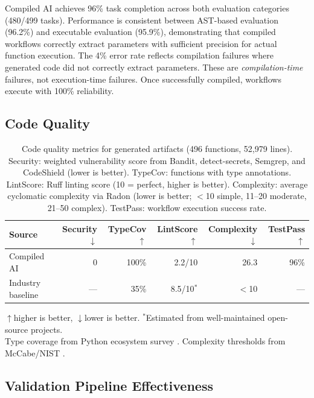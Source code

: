 \documentclass[11pt]{article}
\begin{document}
Compiled AI achieves 96\% task completion across both evaluation categories (480/499 tasks). Performance is consistent between AST-based evaluation (96.2\%) and executable evaluation (95.9\%), demonstrating that compiled workflows correctly extract parameters with sufficient precision for actual function execution. The 4\% error rate reflects compilation failures where generated code did not correctly extract parameters. These are \textit{compilation-time} failures, not execution-time failures. Once successfully compiled, workflows execute with 100\% reliability.

\subsection{Code Quality}

\begin{table}[ht]
\centering
\caption{Code quality metrics for generated artifacts (496 functions, 52,979 lines). Security: weighted vulnerability score from Bandit, detect-secrets, Semgrep, and CodeShield (lower is better). TypeCov: functions with type annotations. LintScore: Ruff linting score (10 = perfect, higher is better). Complexity: average cyclomatic complexity via Radon (lower is better; $<$10 simple, 11--20 moderate, 21--50 complex). TestPass: workflow execution success rate.}
\label{tab:quality-results}
\begin{tabular}{lrrrrr}
\toprule
Source & Security$\downarrow$ & TypeCov$\uparrow$ & LintScore$\uparrow$ & Complexity$\downarrow$ & TestPass$\uparrow$ \\
\midrule
Compiled AI & 0 & 100\% & 2.2/10 & 26.3 & 96\% \\
Industry baseline & --- & 35\% & 8.5/10$^*$ & $<$10 & --- \\
\bottomrule
\end{tabular}
\begin{flushleft}
\scriptsize{$\uparrow$higher is better, $\downarrow$lower is better. $^*$Estimated from well-maintained open-source projects.\\
Type coverage from Python ecosystem survey \citep{pythontypecoverage2024}. Complexity thresholds from McCabe/NIST \citep{mccabe1976}.}
\end{flushleft}
\end{table}

\subsection{Validation Pipeline Effectiveness}
\end{document}
